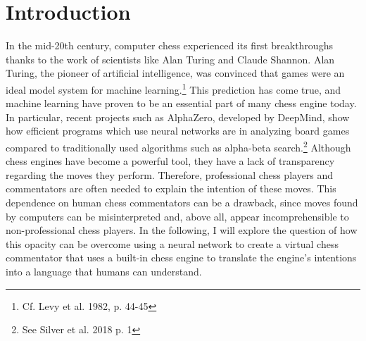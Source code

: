 \section{Introduction}

In the mid-20th century, computer chess experienced its first breakthroughs thanks to the work of scientists like Alan Turing and Claude Shannon. Alan Turing, the pioneer of artificial intelligence, was convinced that games were an ideal model system for machine learning.\footnote{Cf. Levy et al. 1982, p. 44-45} This prediction has come true, and machine learning have proven to be an essential part of many chess engine today. In particular, recent projects such as AlphaZero, developed by DeepMind, show how efficient programs which use neural networks are in analyzing board games compared to traditionally used algorithms such as alpha-beta search.\footnote{See Silver et al. 2018 p. 1} Although chess engines have become a powerful tool, they have a lack of transparency regarding the moves they perform. Therefore, professional chess players and commentators are often needed to explain the intention of these moves. This dependence on human chess commentators can be a drawback, since moves found by computers can be misinterpreted and, above all, appear incomprehensible to non-professional chess players. In the following, I will explore the question of how this opacity can be overcome using a neural network to create a virtual chess commentator that uses a built-in chess engine to translate the engine's intentions into a language that humans can understand.